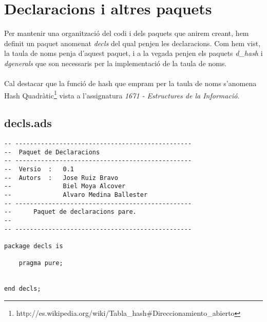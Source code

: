 \documentclass[10pt]{report}
\begin{document}
    \newpage
    \chapter{Declaracions i altres paquets}
        Per mantenir una organització del codi i dels paquets que anirem creant, hem definit un paquet anomenat \textit{decls} del qual penjen les declaracions. Com hem vist, la taula de noms penja d'aquest paquet, i a la vegada penjen els paquets \textit{d\_hash} i \textit{dgenerals} que son necessaris per la implementació de la taula de noms.
    \\
    \\
        Cal destacar que la funció de hash que empram per la taula de noms s'anomena Hash Quadràtic\footnote{http://es.wikipedia.org/wiki/Tabla\_hash\#Direccionamiento\_abierto} vista a l'assignatura \textit{1671 - Estructures de la Informació}.
    \newpage
    \section{decls.ads}
    \begin{lstlisting}[style=Ada]
-- ------------------------------------------------
--  Paquet de Declaracions
-- ------------------------------------------------
--  Versio  :   0.1
--  Autors  :   Jose Ruiz Bravo
--              Biel Moya Alcover
--              Alvaro Medina Ballester
-- ------------------------------------------------
--      Paquet de declaracions pare.
--
-- ------------------------------------------------

package decls is

    pragma pure;


end decls;
    \end{lstlisting}
    
    \newpage
\end{document}
